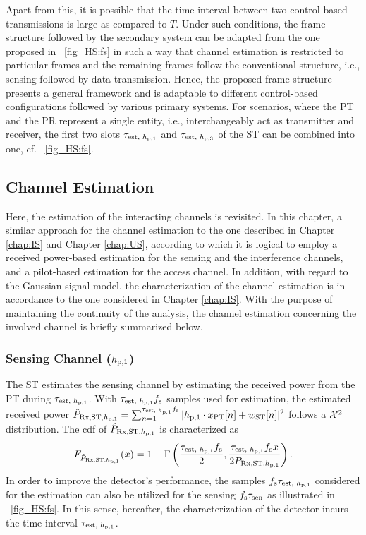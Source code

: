 Apart from this, it is possible that the time interval between two control-based transmissions is large as compared to $T$. Under such conditions, the frame structure followed by the secondary system can be adapted from the one proposed in \figurename~\ref{fig_HS:fs} in such a way that channel estimation is restricted to particular frames and the remaining frames follow the conventional structure, i.e., sensing followed by data transmission. Hence, the proposed frame structure presents a general framework and is adaptable to different control-based configurations followed by various primary systems. For scenarios, where the PT and the PR represent a single entity, i.e., interchangeably act as transmitter and receiver, the first two slots $\tau_{\text{est, $h_{\text{p,1}}$}}$ and $\tau_{\text{est, $h_{\text{p,3}}$}}$ of the ST can be combined into one, cf. \figurename~\ref{fig_HS:fs}. 


\subsection{Channel Estimation}
Here, the estimation of the interacting channels is revisited. In this chapter, a similar approach for the channel estimation to the one described in Chapter \ref{chap:IS} and Chapter \ref{chap:US}, according to which it is logical to employ a received power-based estimation for the sensing and the interference channels, and a pilot-based estimation for the access channel. In addition, with regard to the Gaussian signal model, the characterization of the channel estimation is in accordance to the one considered in Chapter \ref{chap:IS}. With the purpose of maintaining the continuity of the analysis, the channel estimation concerning the involved channel is briefly summarized below. 
\subsubsection*{Sensing Channel ($h_{\text{p,1}}$)}
The ST estimates the sensing channel by estimating the received power from the PT during $\tau_{\text{est, $h_{\text{p,1}}$}}$. With $\tau_{\text{est, $h_{\text{p,1}}$}} f_{\text{s}}$ samples used for estimation, the estimated received power $\hat{P}_{\text{Rx,ST,$h_{\text{p,1}}$}} = \sum_{n = 1}^{\tau_{\text{est, $h_{\text{p,1}}$}} f_{\text{s}}} |h_{\text{p,1}} \cdot x_{\text{PT}}[n] + w_{\text{ST}}[n]|^2$ follows a $\cchi2$ distribution.
The cdf of $\hat{P}_{\text{Rx,ST,$h_{\text{p,1}}$}}$ is characterized as
\begin{align}
F_{\hat{P}_{\text{Rx,ST,$h_{\text{p,1}}$}}}(x) = 1 - \Gamma \left( \frac{\tau_{\text{est, $h_{\text{p,1}}$}} f_{\text{s}}}{2}, \frac{\tau_{\text{est, $h_{\text{p,1}}$}} f_{\text{s}} x}{2 P_{\text{Rx,ST,$h_{\text{p,1}}$}}} \right) \label{eq_HS:fprcvdstpt}.
\end{align}
In order to improve the detector's performance, the samples $f_{\text{s}} \tau_{\text{est, $h_{\text{p,1}}$}}$ considered for the estimation can also be utilized for the sensing $f_{\text{s}} \tau_{\text{sen}}$ as illustrated in \figurename~\ref{fig_HS:fs}. In this sense, hereafter, the characterization of the detector incurs the time interval $\tau_{\text{est, $h_{\text{p,1}}$}}$. 
  
